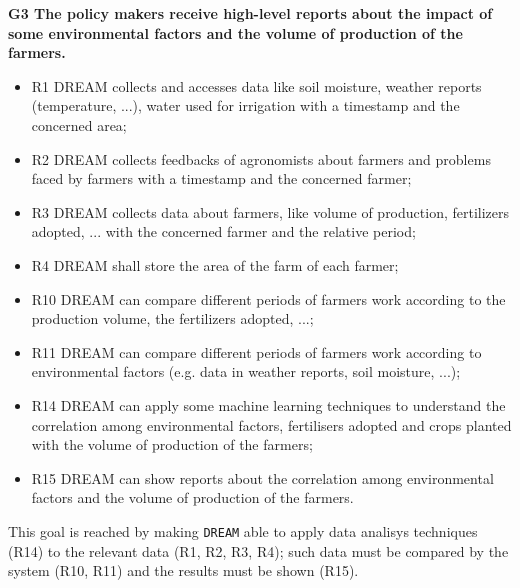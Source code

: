 \documentclass{article}
\begin{document}
\vspace{5mm}
\textbf{G3 The policy makers receive high-level reports about the impact of some environmental factors and the volume of production of the farmers.}
\begin{itemize}
    \item R1 DREAM collects and accesses data like soil moisture, weather reports (temperature, ...), water used for irrigation with a timestamp and the concerned area;

    \item R2 DREAM collects feedbacks of agronomists about farmers and problems faced by farmers with a timestamp and the concerned farmer;

    \item R3 DREAM collects data about farmers, like volume of production, fertilizers adopted, ... with the concerned farmer and the relative period;

    \item R4 DREAM shall store the area of the farm of each farmer;

    \item R10 DREAM can compare different periods of farmers work according to the production volume, the fertilizers adopted, ...;

    \item R11 DREAM can compare different periods of farmers work according to environmental factors (e.g. data in weather reports, soil moisture, ...);

    \item R14 DREAM can apply some machine learning techniques to understand the correlation among environmental factors, fertilisers adopted and crops planted with the volume of production of the farmers;

    \item R15 DREAM can show reports about the correlation among environmental factors and the volume of production of the farmers.
\end{itemize}
This goal is reached by making \verb|DREAM| able to apply data analisys techniques (R14) to the relevant data (R1, R2, R3, R4); such data must be compared by the system (R10, R11) and the results must be shown (R15).
\end{document}
